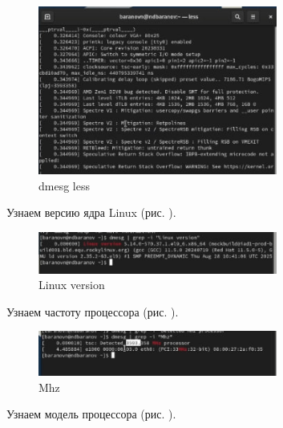 \documentclass[
  12pt,
  a4paper,
  DIV=11,
  numbers=noendperiod]{scrreprt}
\begin{document}
\begin{figure}

{\centering \includegraphics[width=0.7\textwidth,height=\textheight]{image/7.jpg}

}

\caption{dmesg \textbar{} less}

\end{figure}%

Узнаем версию ядра Linux (рис. \autocite*{fig:008}).

\begin{figure}

{\centering \includegraphics[width=0.7\textwidth,height=\textheight]{image/8.jpg}

}

\caption{Linux version}

\end{figure}%

Узнаем частоту процессора (рис. \autocite*{fig:009}).

\begin{figure}

{\centering \includegraphics[width=0.7\textwidth,height=\textheight]{image/9.jpg}

}

\caption{Mhz}

\end{figure}%

Узнаем модель процессора (рис. \autocite*{fig:010}).
\end{document}
